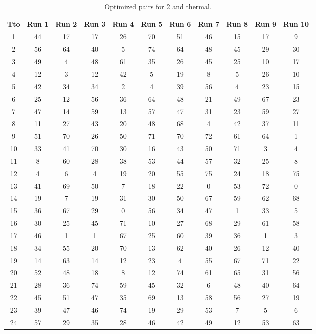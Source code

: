 \begin{table}
  \centering
  \scriptsize
  \caption{Optimized pairs for 2 and thermal.}
  \label{tab_pairs}
\begin{tabular}{c c c c c c c c c c c }
\hline
Tto & Run 1 & Run 2 & Run 3 & Run 4 & Run 5 & Run 6 & Run 7 & Run 8 & Run 9 & Run 10 \\
\hline
1 & 44 & 17 & 17 & 26 & 70 & 51 & 46 & 15 & 17 & 9 \\
2 & 56 & 64 & 40 & 5 & 74 & 64 & 48 & 45 & 29 & 30 \\
3 & 49 & 4 & 48 & 61 & 35 & 26 & 45 & 25 & 10 & 17 \\
4 & 12 & 3 & 12 & 42 & 5 & 19 & 8 & 5 & 26 & 10 \\
5 & 42 & 34 & 34 & 2 & 4 & 39 & 56 & 4 & 23 & 15 \\
6 & 25 & 12 & 56 & 36 & 64 & 48 & 21 & 49 & 67 & 23 \\
7 & 47 & 14 & 59 & 13 & 57 & 47 & 31 & 23 & 59 & 27 \\
8 & 11 & 27 & 43 & 20 & 48 & 68 & 4 & 42 & 37 & 11 \\
9 & 51 & 70 & 26 & 50 & 71 & 70 & 72 & 61 & 64 & 1 \\
10 & 33 & 41 & 70 & 30 & 16 & 43 & 50 & 71 & 3 & 4 \\
11 & 8 & 60 & 28 & 38 & 53 & 44 & 57 & 32 & 25 & 8 \\
12 & 4 & 6 & 4 & 19 & 20 & 55 & 75 & 24 & 18 & 75 \\
13 & 41 & 69 & 50 & 7 & 18 & 22 & 0 & 53 & 72 & 0 \\
14 & 19 & 7 & 19 & 31 & 30 & 50 & 67 & 59 & 62 & 68 \\
15 & 36 & 67 & 29 & 0 & 56 & 34 & 47 & 1 & 33 & 5 \\
16 & 30 & 25 & 45 & 71 & 10 & 27 & 68 & 29 & 61 & 58 \\
17 & 46 & 1 & 1 & 67 & 25 & 60 & 39 & 36 & 1 & 3 \\
18 & 34 & 55 & 20 & 70 & 13 & 62 & 40 & 26 & 12 & 40 \\
19 & 14 & 63 & 14 & 12 & 23 & 4 & 55 & 67 & 71 & 22 \\
20 & 52 & 48 & 18 & 8 & 12 & 74 & 61 & 65 & 31 & 56 \\
21 & 28 & 36 & 74 & 59 & 45 & 32 & 6 & 48 & 40 & 64 \\
22 & 45 & 51 & 47 & 35 & 69 & 13 & 58 & 56 & 27 & 19 \\
23 & 39 & 47 & 46 & 74 & 19 & 29 & 53 & 7 & 5 & 6 \\
24 & 57 & 29 & 35 & 28 & 46 & 42 & 49 & 12 & 53 & 63 \\

\end{tabular}
\end{table}
